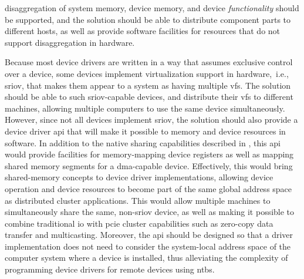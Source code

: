     
\begin{objective}\label{obj:disaggregation}
    \Gls{disaggregation} of system memory, device memory, and device \emph{functionality} should be supported, and the solution should be able to distribute component parts to different hosts, as well as provide software facilities for resources that do not support \gls{disaggregation} in hardware.
\end{objective}
Because most device drivers are written in a way that assumes exclusive control over a device, some devices implement virtualization support in hardware,~i.e., \gls{sriov}, that makes them appear to a system as having multiple \glspl{vf}. 
%
The solution should be able to  such \gls{sriov}-capable devices, and distribute their \glspl{vf} to different machines, allowing multiple computers to use the same device simultaneously.
%
However, since not all devices implement \gls{sriov}, the solution should also provide a device driver \gls{api} that will make it possible to  memory and device resources in software.
%
In addition to the native sharing capabilities described in , this \gls{api} 
would provide facilities for memory-mapping device registers as well as mapping shared memory segments for a \gls{dma}-capable device.
%
Effectively, this would bring shared-memory concepts to device driver implementations, allowing device operation and device resources to become part of the same global address space as distributed cluster applications.
%
This would allow multiple machines to simultaneously share the same, non-\gls{sriov} device, as well as making it possible to combine traditional \gls{io} with \gls{pcie} cluster capabilities such as zero-copy data transfer and multicasting.
%
Moreover, the \gls{api} should be designed so that a driver implementation does not need to consider the system-local address space of the computer system where a device is installed, thus alleviating the complexity of programming device drivers for remote devices using \glspl{ntb}.



